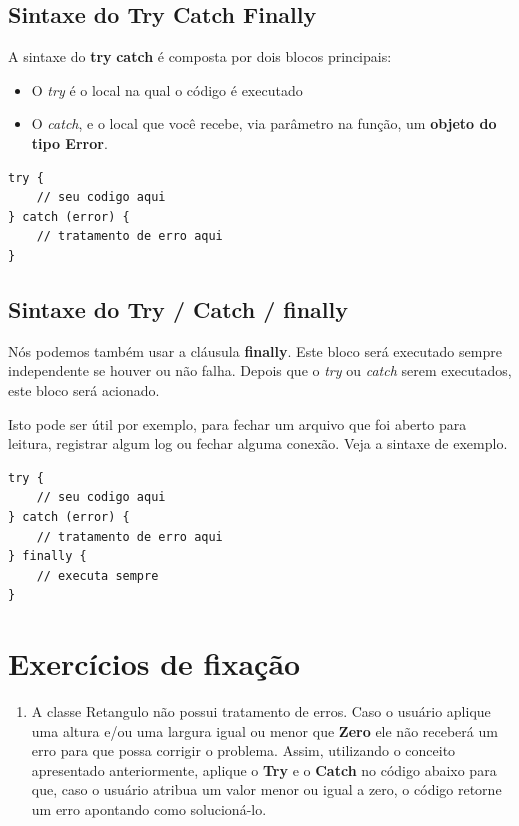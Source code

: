 \subsection{Sintaxe do Try Catch Finally}

A sintaxe do \textbf{try} \textbf{catch} é composta por dois blocos principais:
\begin{itemize}
	\item O \textit{try} é o local na qual o código é executado 
	\item O \textit{catch}, e o local que você recebe, via parâmetro na função, um \textbf{objeto do tipo Error}. 
\end{itemize}

\begin{verbatim}
try {
	// seu codigo aqui
} catch (error) {
	// tratamento de erro aqui
}
\end{verbatim}

\subsection{Sintaxe do Try / Catch / finally}	
Nós podemos também usar a cláusula \textbf{finally}. Este bloco será executado sempre independente se houver ou não falha. Depois que o \textit{try} ou \textit{catch} serem executados, este bloco será acionado. 

Isto pode ser útil por exemplo, para fechar um arquivo que foi aberto para leitura, registrar algum log ou fechar alguma conexão. Veja a sintaxe de exemplo.

\begin{verbatim}
try {
	// seu codigo aqui
} catch (error) {
	// tratamento de erro aqui
} finally {
	// executa sempre
}
\end{verbatim}

\section{Exercícios de fixação}

\begin{enumerate}
	\item A classe Retangulo não possui tratamento de erros. Caso o usuário aplique uma altura e/ou uma largura igual ou menor que \textbf{Zero} ele não receberá um erro para que possa corrigir o problema. Assim, utilizando o conceito apresentado anteriormente, aplique o \textbf{Try} e o \textbf{Catch} no código abaixo para que, caso o usuário atribua um valor menor ou igual a zero, o código retorne um erro apontando como solucioná-lo. 
\end{enumerate}

